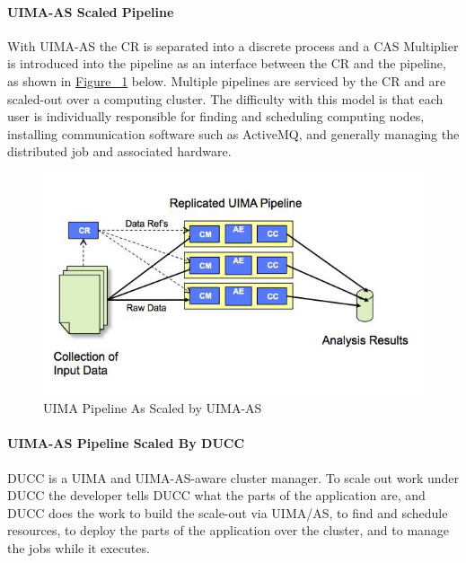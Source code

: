     \paragraph{UIMA-AS  Scaled Pipeline}
    With UIMA-AS the CR is separated into a discrete process and a CAS Multiplier is introduced 
    into the pipeline as an interface between the CR and the pipeline, as shown in
    \hyperref[fig:UIMA-AS-pipeline]{Figure ~\ref{fig:UIMA-AS-pipeline}} below.
    Multiple pipelines are serviced by the 
    CR and are scaled-out over a computing cluster.  The difficulty with this model is that each
    user is individually responsible for finding and scheduling computing nodes, installing
    communication software such as ActiveMQ, and generally managing the distributed job and
    associated hardware.

    \begin{figure}[H]
      \centering
      \includegraphics[width=5.5in]{images/uima-as-pipeline.jpg}
      \caption{UIMA Pipeline As Scaled by UIMA-AS}
      \label{fig:UIMA-AS-pipeline}
    \end{figure}

    \paragraph{UIMA-AS Pipeline Scaled By DUCC}
    DUCC is a UIMA and  UIMA-AS-aware cluster manager.  To scale out work under DUCC the developer
    tells DUCC what the parts of the application are, and DUCC does the work to build the
    scale-out via UIMA/AS, to find and schedule resources, to deploy the parts of the application
    over the cluster, and to manage the jobs while it executes.

